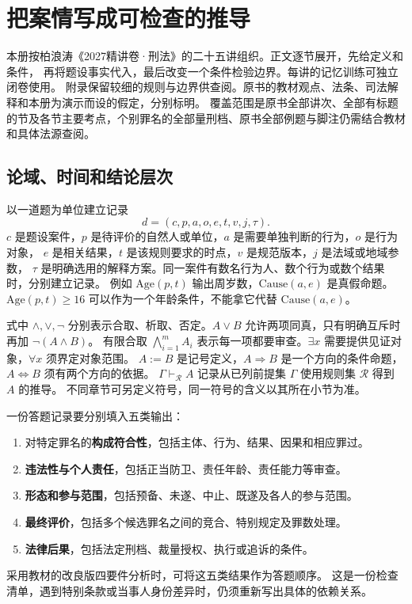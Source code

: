 \chapter{把案情写成可检查的推导}
\label{chap:method}

本册按柏浪涛《2027精讲卷·刑法》的二十五讲组织。正文逐节展开，先给定义和条件，
再将题设事实代入，最后改变一个条件检验边界。每讲的记忆训练可独立闭卷使用。
附录保留较细的规则与边界供查阅。原书的教材观点、法条、司法解释和本册为演示而设的假定，分别标明。
覆盖范围是原书全部讲次、全部有标题的节及各节主要考点，个别罪名的全部量刑档、原书全部例题与脚注仍需结合教材和具体法源查阅。

\section{论域、时间和结论层次}

以一道题为单位建立记录
\[
 d=(c,p,a,o,e,t,v,j,\tau).
\]
$c$ 是题设案件，$p$ 是待评价的自然人或单位，$a$ 是需要单独判断的行为，$o$ 是行为对象，
$e$ 是相关结果，$t$ 是该规则要求的时点，$v$ 是规范版本，$j$ 是法域或地域参数，
$\tau$ 是明确选用的解释方案。同一案件有数名行为人、数个行为或数个结果时，分别建立记录。
例如 $\mathrm{Age}(p,t)$ 输出周岁数，$\mathrm{Cause}(a,e)$ 是真假命题。
$\mathrm{Age}(p,t)\ge16$ 可以作为一个年龄条件，不能拿它代替 $\mathrm{Cause}(a,e)$。

式中 $\land,\lor,\neg$ 分别表示合取、析取、否定。$A\lor B$ 允许两项同真，只有明确互斥时再加 $\neg(A\land B)$。
有限合取 $\bigwedge_{i=1}^m A_i$ 表示每一项都要审查。$\exists x$ 需要提供见证对象，$\forall x$ 须界定对象范围。
$A:=B$ 是记号定义，$A\Rightarrow B$ 是一个方向的条件命题，$A\Leftrightarrow B$ 须有两个方向的依据。
$\Gamma\vdash_{\mathcal R} A$ 记录从已列前提集 $\Gamma$ 使用规则集 $\mathcal R$ 得到 $A$ 的推导。
不同章节可另定义符号，同一符号的含义以其所在小节为准。

一份答题记录要分别填入五类输出：
\begin{enumerate}
 \item 对特定罪名的\textbf{构成符合性}，包括主体、行为、结果、因果和相应罪过。
 \item \textbf{违法性与个人责任}，包括正当防卫、责任年龄、责任能力等审查。
 \item \textbf{形态和参与范围}，包括预备、未遂、中止、既遂及各人的参与范围。
 \item \textbf{最终评价}，包括多个候选罪名之间的竞合、特别规定及罪数处理。
 \item \textbf{法律后果}，包括法定刑档、裁量授权、执行或追诉的条件。
\end{enumerate}
采用教材的改良版四要件分析时，可将这五类结果作为答题顺序。
这是一份检查清单，遇到特别条款或当事人身份差异时，仍须重新写出具体的依赖关系。

